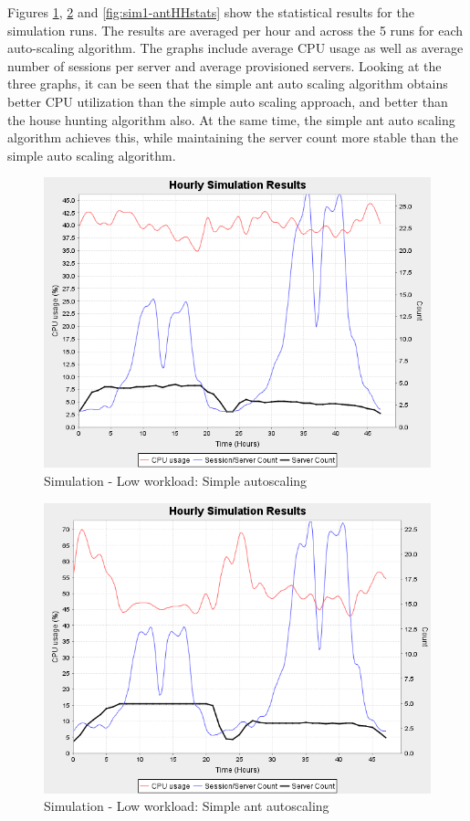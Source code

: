 \documentclass[conference]{IEEEtran}
\begin{document}
Figures \ref{fig:sim1-basestats}, \ref{fig:sim1-antSimplestats} and \ref{fig:sim1-antHHstats} show the statistical results for the simulation runs. The results are averaged per hour and across the 5 runs for each auto-scaling algorithm. The graphs include average CPU usage as well as average number of sessions per server and average provisioned servers. Looking at the three graphs, it can be seen that the simple ant auto scaling algorithm obtains better CPU utilization than the simple auto scaling approach, and better than the house hunting algorithm also. At the same time, the simple ant auto scaling algorithm achieves this, while maintaining the server count more stable than the simple auto scaling algorithm.

\begin{figure}
	\centering
		\includegraphics[width=0.75\columnwidth]{results/sim1/sim1-basestats.png}
	\caption{Simulation - Low workload: Simple autoscaling}
	\label{fig:sim1-basestats}
\end{figure}

\begin{figure}
	\centering
		\includegraphics[width=0.75\columnwidth]{results/sim1/sim1-antSimplestats.png}
	\caption{Simulation - Low workload: Simple ant autoscaling}
	\label{fig:sim1-antSimplestats}
\end{figure}
\end{document}
